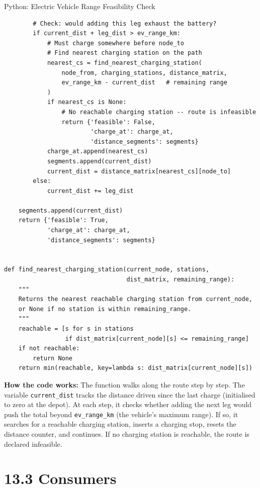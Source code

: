 \documentclass[aspectratio=169,10pt]{beamer}
\begin{document}
\begin{frame}[fragile]{Python: Electric Vehicle Range Feasibility Check}
\begin{lstlisting}
        # Check: would adding this leg exhaust the battery?
        if current_dist + leg_dist > ev_range_km:
            # Must charge somewhere before node_to
            # Find nearest charging station on the path
            nearest_cs = find_nearest_charging_station(
                node_from, charging_stations, distance_matrix,
                ev_range_km - current_dist   # remaining range
            )
            if nearest_cs is None:
                # No reachable charging station -- route is infeasible
                return {'feasible': False,
                        'charge_at': charge_at,
                        'distance_segments': segments}
            charge_at.append(nearest_cs)
            segments.append(current_dist)
            current_dist = distance_matrix[nearest_cs][node_to]
        else:
            current_dist += leg_dist

    segments.append(current_dist)
    return {'feasible': True,
            'charge_at': charge_at,
            'distance_segments': segments}


def find_nearest_charging_station(current_node, stations,
                                  dist_matrix, remaining_range):
    """
    Returns the nearest reachable charging station from current_node,
    or None if no station is within remaining_range.
    """
    reachable = [s for s in stations
                 if dist_matrix[current_node][s] <= remaining_range]
    if not reachable:
        return None
    return min(reachable, key=lambda s: dist_matrix[current_node][s])
  \end{lstlisting}

  \smallskip
  \textbf{How the code works:}
  The function walks along the route step by step.  The variable
  \texttt{current\_dist} tracks the distance driven since the last
  charge (initialised to zero at the depot).  At each step, it checks
  whether adding the next leg would push the total beyond
  \texttt{ev\_range\_km} (the vehicle's maximum range).  If so, it
  searches for a reachable charging station, inserts a charging stop,
  resets the distance counter, and continues.  If no charging station
  is reachable, the route is declared infeasible.

\end{frame}

\section{13.3 Consumers}
\end{document}
